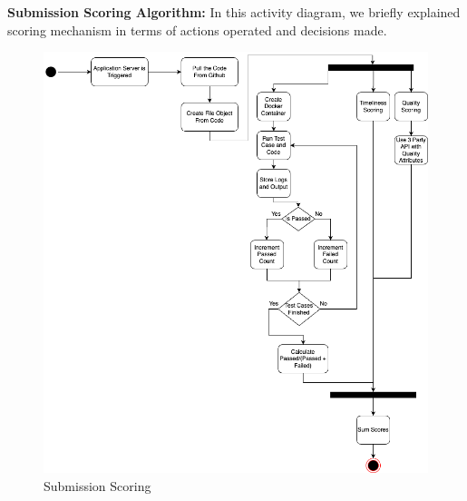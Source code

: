 \newpage
\textbf{Submission Scoring  Algorithm:}
In this activity diagram, we briefly explained scoring mechanism in terms of actions operated and decisions made. 
\begin{figure}[H]
    \centering
    \includegraphics[width=\linewidth]{Images/DD-Sandbox.drawio.png}
    \caption{Submission Scoring}
\end{figure}



